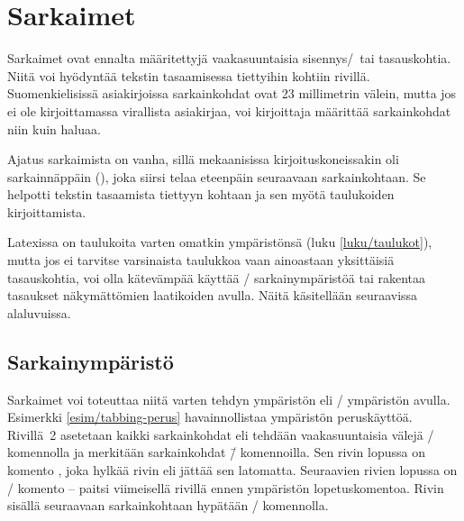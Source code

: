 \section{Sarkaimet}
\label{luku/sarkaimet}

Sarkaimet ovat ennalta määritettyjä vaakasuuntaisia sisennys\-/\ tai
tasauskohtia. Niitä voi hyödyntää tekstin tasaamisessa tiettyihin
kohtiin rivillä. Suomenkielisissä asiakirjoissa sarkainkohdat ovat 23
millimetrin välein, mutta jos ei ole kirjoittamassa virallista
asiakirjaa, voi kirjoittaja määrittää sarkainkohdat niin kuin haluaa.

Ajatus sarkaimista on vanha, sillä mekaanisissa kirjoituskoneissakin oli
sarkainnäppäin (), joka siirsi telaa eteenpäin
seuraavaan sarkainkohtaan. Se helpotti tekstin tasaamista tiettyyn
kohtaan ja sen myötä taulukoiden kirjoittamista.

Latexissa on taulukoita varten omatkin ympäristönsä (luku
\ref{luku/taulukot}), mutta jos ei tarvitse varsinaista taulukkoa vaan
ainoastaan yksittäisiä tasauskohtia, voi olla kätevämpää käyttää
\-/ sarkainympäristöä tai rakentaa tasaukset
näkymättömien laatikoiden avulla. Näitä käsitellään seuraavissa
alaluvuissa.

\subsection{Sarkainympäristö}

Sarkaimet voi toteuttaa niitä varten tehdyn ympäristön eli
\-/ ympäristön avulla. Esimerkki
\ref{esim/tabbing-perus} havainnollistaa ympäristön peruskäyttöä.
Rivillä~2 asetetaan kaikki sarkainkohdat eli tehdään vaakasuuntaisia
välejä \-/ komennolla ja merkitään sarkainkohdat
\komento{=}\=/ komennoilla. Sen rivin lopussa on komento ,
joka hylkää rivin eli jättää sen latomatta. Seuraavien rivien lopussa on
\komento{\keno}\-/ komento -- paitsi viimeisellä rivillä ennen
ympäristön lopetuskomentoa. Rivin sisällä seuraavaan sarkainkohtaan
hypätään \komento{>}\-/ komennolla.

